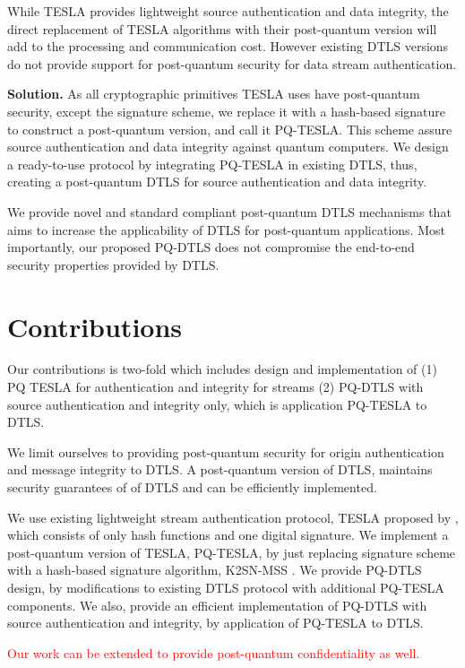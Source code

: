 While TESLA provides lightweight source authentication and data integrity, the direct replacement of TESLA algorithms with their post-quantum version will add to the processing and communication cost. However existing DTLS versions do not provide support for post-quantum security for data stream authentication. 

\textbf{Solution.} 
As all cryptographic primitives TESLA uses have post-quantum security, except the signature scheme, we replace it with a hash-based signature to construct a post-quantum version, and call it PQ-TESLA. This scheme assure source authentication and data integrity against quantum computers. We design a ready-to-use protocol by integrating PQ-TESLA in existing DTLS, thus, creating a post-quantum DTLS for source authentication and data integrity.

We provide novel and standard compliant post-quantum DTLS mechanisms that aims to increase the applicability of DTLS for post-quantum applications. Most importantly, our proposed PQ-DTLS does not compromise the end-to-end security properties provided by DTLS. 

 
\section{Contributions}
Our contributions is two-fold which includes design and implementation of (1) PQ TESLA for authentication and integrity for streams (2) PQ-DTLS with source authentication and integrity only, which is application PQ-TESLA to DTLS. 

We limit ourselves to providing post-quantum security for origin  authentication and message integrity to DTLS. A post-quantum version of DTLS, maintains security guarantees of of DTLS and can be efficiently implemented. 

We use existing lightweight stream authentication protocol, TESLA proposed by \cite{perrig2000efficient}, which consists of only hash functions and one digital signature. We implement a post-quantum version of TESLA, PQ-TESLA, by just replacing signature scheme with a hash-based signature algorithm, K2SN-MSS \cite{karati2019k2sn}. We provide PQ-DTLS design, by modifications to existing DTLS protocol with additional PQ-TESLA components. We also, provide an efficient implementation of PQ-DTLS with source authentication and integrity, by application of PQ-TESLA to DTLS.


\textcolor{red}{Our work can be extended to provide post-quantum confidentiality as well.}

